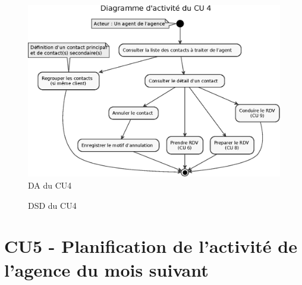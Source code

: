 \begin{figure}[H]
\centering
\includegraphics[width=\textwidth]{figures/eps/DA_CU4.eps}
\caption{DA du CU4}
\end{figure}

\begin{figure}[H]
\noindent{}
\caption{DSD du CU4}
\end{figure}



\clearpage
\section{CU5 - Planification de l’activité de l’agence du mois suivant}

